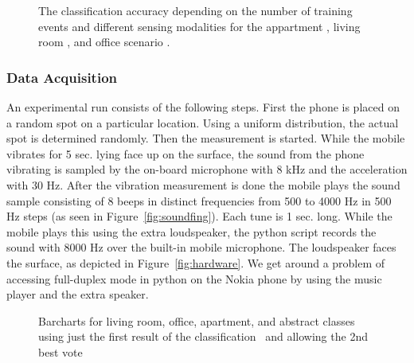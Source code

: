 \begin{figure}[t]
  \begin{center}
	
	
   \end{center}
\caption[Accuracy versus training samples]{ The classification accuracy depending on the number of training events and different sensing modalities for the appartment , 
living room , and office scenario .}
\label{fig:training}
\end{figure} 


\subsubsection{Data Acquisition}
An experimental run consists of the following steps. First the phone
is placed on a random spot on a particular location. Using a uniform
distribution, the actual spot is determined randomly. Then the
measurement is started. While the mobile vibrates for 5 sec. lying
face up on the surface, the sound from the phone
vibrating is sampled by the on-board microphone with 8
kHz and the acceleration with 30 Hz. After the vibration measurement
is done the mobile plays the sound sample consisting of 8 beeps in
distinct frequencies from 500 to 4000 Hz in 500 Hz steps (as seen in Figure~\ref{fig:soundfing}). Each tune is
1 sec. long. While the mobile plays this using the extra loudspeaker,
the python script records the sound with 8000 Hz over the built-in
mobile microphone. The loudspeaker faces the surface, as depicted in
Figure~\ref{fig:hardware}. We get around a problem of accessing
full-duplex mode in python on the Nokia phone by using the music
player and the extra speaker.


\begin{figure}[t]
  \begin{center}
   \end{center}
\caption[Classification performance per scenario]{ Barcharts for living room, office, apartment, and abstract
 classes using just the first result of the
 classification~ and allowing the 2nd best
 vote~}

\label{fig:barcharts}
\end{figure} 



